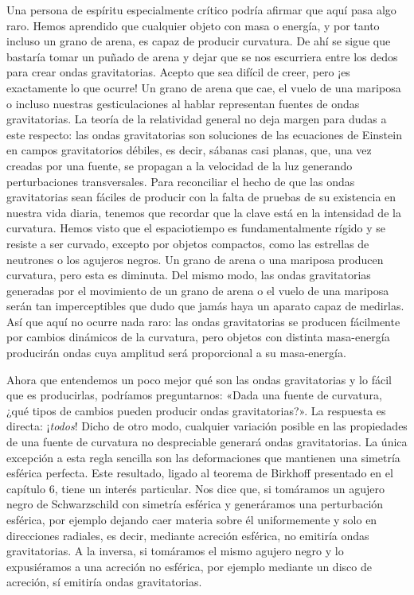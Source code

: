 Una persona de espíritu especialmente crítico podría afirmar que aquí pasa algo raro. Hemos aprendido que cualquier objeto con masa o energía, y por tanto incluso un grano de arena, es capaz de producir curvatura. De ahí se sigue que bastaría tomar un puñado de arena y dejar que se nos escurriera entre los dedos para crear ondas gravitatorias. Acepto que sea difícil de creer, pero ¡es exactamente lo que ocurre! Un grano de arena que cae, el vuelo de una mariposa o incluso nuestras gesticulaciones al hablar representan fuentes de ondas gravitatorias. La teoría de la relatividad general no deja margen para dudas a este respecto: las ondas gravitatorias son soluciones de las ecuaciones de Einstein en campos gravitatorios débiles, es decir, sábanas casi planas, que, una vez creadas por una fuente, se propagan a la velocidad de la luz generando perturbaciones transversales. Para reconciliar el hecho de que las ondas gravitatorias sean fáciles de producir con la falta de pruebas de su existencia en nuestra vida diaria, tenemos que recordar que la clave está en la intensidad de la curvatura. Hemos visto que el espaciotiempo es fundamentalmente rígido y se resiste a ser curvado, excepto por objetos compactos, como las estrellas de neutrones o los agujeros negros. Un grano de arena o una mariposa producen curvatura, pero esta es diminuta. Del mismo modo, las ondas gravitatorias generadas por el movimiento de un grano de arena o el vuelo de una mariposa serán tan imperceptibles que dudo que jamás haya un aparato capaz de medirlas. Así que aquí no ocurre nada raro: las ondas gravitatorias se producen fácilmente por cambios dinámicos de la curvatura, pero objetos con distinta masa-energía producirán ondas cuya amplitud será proporcional a su masa-energía.

Ahora que entendemos un poco mejor qué son las ondas gravitatorias y lo fácil que es producirlas, podríamos preguntarnos: «Dada una fuente de curvatura, ¿qué tipos de cambios pueden producir ondas gravitatorias?». La respuesta es directa: ¡\emph{todos}! Dicho de otro modo, cualquier variación posible en las propiedades de una fuente de curvatura no despreciable generará ondas gravitatorias. La única excepción a esta regla sencilla son las deformaciones que mantienen una simetría esférica perfecta. Este resultado, ligado al teorema de Birkhoff presentado en el capítulo 6, tiene un interés particular. Nos dice que, si tomáramos un agujero negro de Schwarzschild con simetría esférica y generáramos una perturbación esférica, por ejemplo dejando caer materia sobre él uniformemente y solo en direcciones radiales, es decir, mediante acreción esférica, no emitiría ondas gravitatorias. A la inversa, si tomáramos el mismo agujero negro y lo expusiéramos a una acreción no esférica, por ejemplo mediante un disco de acreción, sí emitiría ondas gravitatorias.

